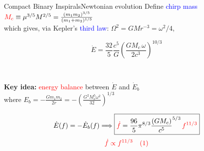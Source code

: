\documentclass[xcolor=dvipsnames,handout,t]{beamer}
\newcommand{\red}[1]{\textcolor{red}{#1}}
\newcommand{\bl}[1]{\textcolor{blue}{#1}}
\newcommand{\f}{\frac}
\begin{document}
\begin{frame}{Compact Binary Inspirals}{Newtonian evolution}
 Define \bl{chirp mass} \hspace{1.cm} $\red{M_c} \equiv \mu^{3/5} M^{2/5} = \tfrac{(m_1 m_2)^{3/5}}{(m_1+m_2)^{1/5}}$ \\
 \vspace{1mm}
  which gives, via Kepler's \bl{third law}: $\Omega^2 = G M r^{-3}=\omega^2/4$,   
 {
  \begin{footnotesize}
  $$ \boxed{\dot{E} = \f{32}{5}\f{c^5}{G} \left(\f{G M_c\, \omega}{2c^3}\right)^{10/3}}$$
  \end{footnotesize}\\
 } 
%
  {
    {\bf Key idea:} \red{energy balance} between $\dot{E}$ and $\dot{E}_b$\\
    \quad where $ E_b= -\tfrac{G m_1 m_2}{2r} = -\left(\tfrac{G^2 M_c^5 \omega^2}{32}\right)^{1/3} $
  }
%
  {
    \[ 
    \dot{E}(f) = -\dot{E}_b(f) \Longrightarrow \boxed{\red{\dot{f}} = \f{96}{5}\pi^{8/3} \f{(G M_c)}{c^5}^{5/3}\, \red{f^{11/3}} }
    \]
    \[
    \red{ \dot{f} \propto f^{11/3}\quad(1)}
    \]
  }

\end{frame}
\end{document}
